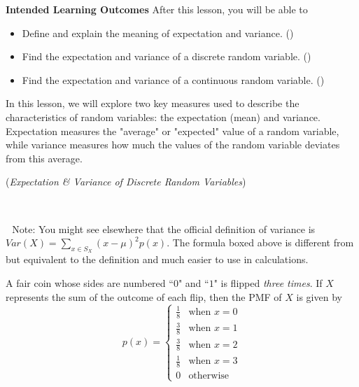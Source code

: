 \documentclass[10pt]{article}
\begin{document}
\thispagestyle{firstpage}
\pagestyle{otherpages}

\textbf{Intended Learning Outcomes}
After this lesson, you will be able to 

\begin{itemize}
    \item Define and explain the meaning of expectation and variance. ()
    \item Find the expectation and variance of a discrete random variable. ()
    \item Find the expectation and variance of a continuous random variable. ()
\end{itemize}

\vspace{-0.5cm}

\hrulefill

In this lesson, we will explore two key measures used to describe the characteristics of random variables: the expectation (mean) and variance. Expectation measures the "average" or "expected" value of a random variable, while variance measures how much the values of the random variable deviates from this average.

\begin{center}
({\it Expectation \& Variance of Discrete Random Variables})
\end{center}

\,\hfill{} \hfill\,

\,\hfill {}\hfill\,
Note: You might see elsewhere that the official definition of variance is $Var(X)=\displaystyle\sum_{x\in S_X}(x-\mu)^2p(x)$. The formula boxed above is different from but equivalent to the definition and much easier to use in calculations.
\medskip


\exercise{} A fair coin whose sides are numbered ``$0$" and ``$1$" is flipped {\it three times}. If $X$ represents the sum of the outcome of each flip, then the PMF of $X$ is given by
\[ p(x)=\begin{cases}
\frac18 & \text{when }x=0\\
\frac38 & \text{when }x=1\\
\frac38 & \text{when }x=2\\
\frac18 & \text{when }x=3\\
0 & \text{otherwise}
\end{cases}\]
\end{document}
